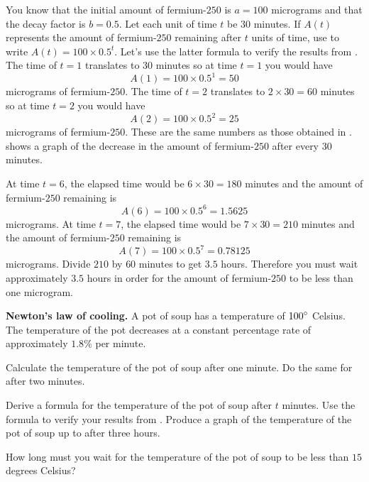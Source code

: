 \documentclass[a4paper,oneside,12pt]{article}
\begin{document}
{\begin{solution}
You know that the initial amount of fermium-$250$ is $a = 100$
micrograms and that the decay factor is $b = 0.5$.  Let each unit of
time $t$ be $30$ minutes.  If $A(t)$ represents the amount of
fermium-$250$ remaining after $t$ units of time, use
 to write $A(t) = 100 \times 0.5^t$.
Let's use the latter formula to verify the results
from .  The time of
$t = 1$ translates to $30$ minutes so at time $t = 1$ you would have
\[
A(1)
=
100 \times 0.5^1
=
50
\]
micrograms of fermium-$250$.  The time of $t = 2$ translates to
$2 \times 30 = 60$ minutes so at time $t = 2$ you would have
\[
A(2)
=
100 \times 0.5^2
=
25
\]
micrograms of fermium-$250$.  These are the same numbers as those
obtained in .
 shows a graph of the decrease in the
amount of fermium-$250$ after every $30$ minutes.

At time $t = 6$, the elapsed time would be $6 \times 30 = 180$ minutes
and the amount of fermium-$250$ remaining is
\[
A(6)
=
100 \times 0.5^6
=
1.5625
\]
micrograms.  At time $t = 7$, the elapsed time would be
$7 \times 30 = 210$ minutes and the amount of fermium-$250$ remaining
is
\[
A(7)
=
100 \times 0.5^7
=
0.78125
\]
micrograms.  Divide $210$ by $60$ minutes to get $3.5$ hours.
Therefore you must wait approximately $3.5$ hours in order for the
amount of fermium-$250$ to be less than one microgram.
\end{solution}
}{}

\begin{exercise}
\textbf{Newton's law of cooling.}
A pot of soup has a temperature of ${100}^{\circ}$ Celsius.  The
temperature of the pot decreases at a constant percentage rate of
approximately $1.8\%$ per minute.
\begin{packedenum}
\item\label{subex:soup_temperature_1minute_2minutes}
  Calculate the temperature of the pot of soup after one minute.  Do
  the same for after two minutes.

\item\label{subex:soup_temperature_formula_graph}
  Derive a formula for the temperature of the pot of soup after $t$
  minutes.  Use the formula to verify your results
  from .  Produce a
  graph of the temperature of the pot of soup up to after three
  hours.

\item\label{subex:soup_temperature_20_degrees}
  How long must you wait for the temperature of the pot of soup to be
  less than $15$ degrees Celsius?
\end{packedenum}
\end{exercise}
\end{document}
